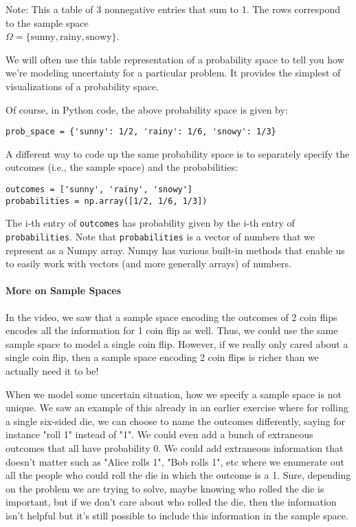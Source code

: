 \documentclass[6008notes.tex]{subfiles}
\begin{document}
Note: This a table of 3 nonnegative entries that sum to 1. The rows correspond to the sample space\\
 $\Omega =\{ \text {sunny},\text {rainy},\text {snowy}\}$.

We will often use this table representation of a probability space to tell you how we're modeling uncertainty for a particular problem. It provides the simplest of visualizations of a probability space.

Of course, in Python code, the above probability space is given by:

\begin{lstlisting}
prob_space = {'sunny': 1/2, 'rainy': 1/6, 'snowy': 1/3}
\end{lstlisting}
A different way to code up the same probability space is to separately specify the outcomes (i.e., the sample space) and the probabilities:

\begin{lstlisting}
outcomes = ['sunny', 'rainy', 'snowy']
probabilities = np.array([1/2, 1/6, 1/3])
\end{lstlisting}
The i-th entry of \texttt{outcomes} has probability given by the i-th entry of \texttt{probabilities}. Note that \texttt{probabilities} is a vector of numbers that we represent as a Numpy array. Numpy has various built-in methods that enable us to easily work with vectors (and more generally arrays) of numbers.

\paragraph{More on Sample Spaces}

In the video, we saw that a sample space encoding the outcomes of 2 coin flips encodes all the information for 1 coin flip as well. Thus, we could use the same sample space to model a single coin flip. However, if we really only cared about a single coin flip, then a sample space encoding 2 coin flips is richer than we actually need it to be!

When we model some uncertain situation, how we specify a sample space is not unique. We saw an example of this already in an earlier exercise where for rolling a single six-sided die, we can choose to name the outcomes differently, saying for instance "roll 1" instead of "1". We could even add a bunch of extraneous outcomes that all have probability 0. We could add extraneous information that doesn't matter such as "Alice rolls 1", "Bob rolls 1", etc where we enumerate out all the people who could roll the die in which the outcome is a 1. Sure, depending on the problem we are trying to solve, maybe knowing who rolled the die is important, but if we don't care about who rolled the die, then the information isn't helpful but it's still possible to include this information in the sample space.
\end{document}
